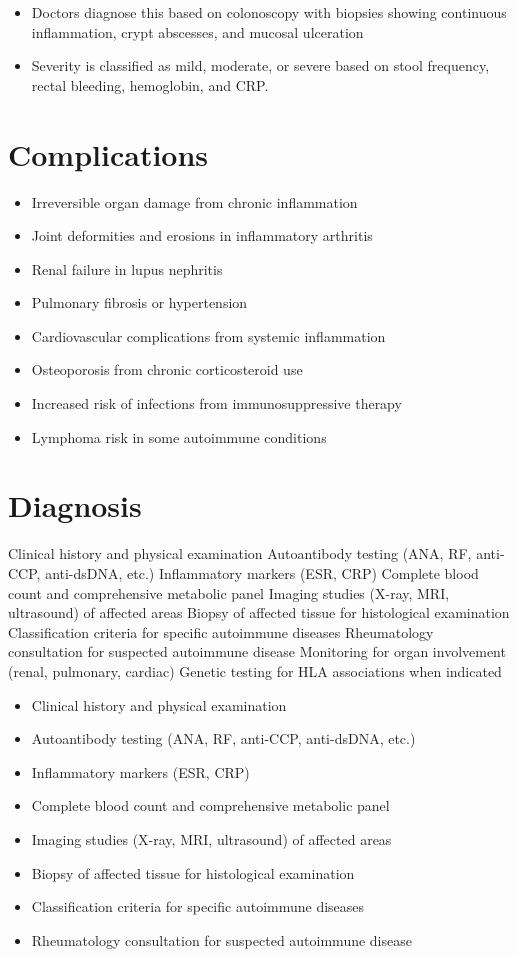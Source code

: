 \begin{itemize}[noitemsep]
  \item Doctors diagnose this based on colonoscopy with biopsies showing continuous inflammation, crypt abscesses, and mucosal ulceration
  \item Severity is classified as mild, moderate, or severe based on stool frequency, rectal bleeding, hemoglobin, and CRP.
\end{itemize}
\section{Complications}
\begin{itemize}[noitemsep]
  \item Irreversible organ damage from chronic inflammation
  \item Joint deformities and erosions in inflammatory arthritis
  \item Renal failure in lupus nephritis
  \item Pulmonary fibrosis or hypertension
  \item Cardiovascular complications from systemic inflammation
  \item Osteoporosis from chronic corticosteroid use
  \item Increased risk of infections from immunosuppressive therapy
  \item Lymphoma risk in some autoimmune conditions
\end{itemize}
\section{Diagnosis}
Clinical history and physical examination Autoantibody testing (ANA, RF, anti-CCP, anti-dsDNA, etc.) Inflammatory markers (ESR, CRP) Complete blood count and comprehensive metabolic panel Imaging studies (X-ray, MRI, ultrasound) of affected areas Biopsy of affected tissue for histological examination Classification criteria for specific autoimmune diseases Rheumatology consultation for suspected autoimmune disease Monitoring for organ involvement (renal, pulmonary, cardiac) Genetic testing for HLA associations when indicated

\begin{itemize}[noitemsep]
  \item Clinical history and physical examination
  \item Autoantibody testing (ANA, RF, anti-CCP, anti-dsDNA, etc.)
  \item Inflammatory markers (ESR, CRP)
  \item Complete blood count and comprehensive metabolic panel
  \item Imaging studies (X-ray, MRI, ultrasound) of affected areas
  \item Biopsy of affected tissue for histological examination
  \item Classification criteria for specific autoimmune diseases
  \item Rheumatology consultation for suspected autoimmune disease
\end{itemize}
